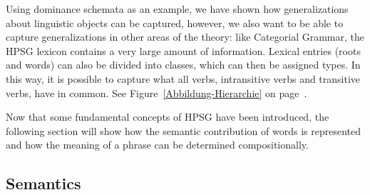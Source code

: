 Using dominance schemata as an example, we have shown how generalizations about linguistic objects
can be captured, however, we also want to be able to capture generalizations in other areas of the
theory: like Categorial Grammar\indexcxg, the HPSG lexicon contains a very large amount
of information. Lexical entries (roots and words) can also be divided into classes, which can then
be assigned types. In this way, it is possible to capture what all verbs, intransitive verbs and
transitive verbs, have in common. See Figure~\ref{Abbildung-Hierarchie} on
page~\pageref{Abbildung-Hierarchie}.

Now that some fundamental concepts of HPSG have been introduced, the following section will show how the semantic contribution of words is represented and
how the meaning of a phrase can be determined compositionally.

\subsection{Semantics}
\label{Abschnitt-HPSG-Semantik}

